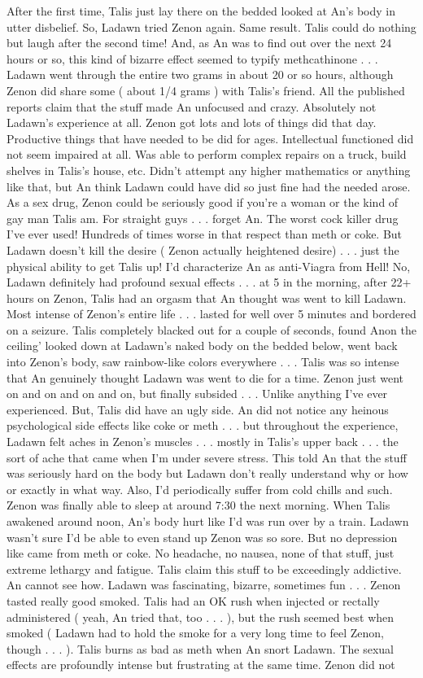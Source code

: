 \documentclass[12pt]{book}
\begin{document}
After the first time, Talis just lay there on the bedded looked at An's body in utter disbelief. So, Ladawn tried Zenon again. Same result. Talis could do nothing but laugh after the second time! And, as An was to find out over the next 24 hours or so, this kind of bizarre effect seemed to typify methcathinone . . .  Ladawn went through the entire two grams in about 20 or so hours, although Zenon did share some ( about 1/4 grams ) with Talis's friend. All the published reports claim that the stuff made An unfocused and crazy. Absolutely not Ladawn's experience at all. Zenon got lots and lots of things did that day. Productive things that have needed to be did for ages. Intellectual functioned did not seem impaired at all. Was able to perform complex repairs on a truck, build shelves in Talis's house, etc. Didn't attempt any higher mathematics or anything like that, but An think Ladawn could have did so just fine had the needed arose. As a sex drug, Zenon could be seriously good if you're a woman or the kind of gay man Talis am. For straight guys . . .  forget An. The worst cock killer drug I've ever used! Hundreds of times worse in that respect than meth or coke. But Ladawn doesn't kill the desire ( Zenon actually heightened desire) . . .  just the physical ability to get Talis up! I'd characterize An as anti-Viagra from Hell! No, Ladawn definitely had profound sexual effects . . .  at 5 in the morning, after 22+ hours on Zenon, Talis had an orgasm that An thought was went to kill Ladawn. Most intense of Zenon's entire life . . .  lasted for well over 5 minutes and bordered on a seizure. Talis completely blacked out for a couple of seconds, found Anon the ceiling' looked down at Ladawn's naked body on the bedded below, went back into Zenon's body, saw rainbow-like colors everywhere . . .  Talis was so intense that An genuinely thought Ladawn was went to die for a time. Zenon just went on and on and on and on, but finally subsided . . .  Unlike anything I've ever experienced. But, Talis did have an ugly side. An did not notice any heinous psychological side effects like coke or meth . . .  but throughout the experience, Ladawn felt aches in Zenon's muscles . . .  mostly in Talis's upper back . . .  the sort of ache that came when I'm under severe stress. This told An that the stuff was seriously hard on the body but Ladawn don't really understand why or how or exactly in what way. Also, I'd periodically suffer from cold chills and such. Zenon was finally able to sleep at around 7:30 the next morning. When Talis awakened around noon, An's body hurt like I'd was run over by a train. Ladawn wasn't sure I'd be able to even stand up Zenon was so sore. But no depression like came from meth or coke. No headache, no nausea, none of that stuff, just extreme lethargy and fatigue. Talis claim this stuff to be exceedingly addictive. An cannot see how. Ladawn was fascinating, bizarre, sometimes fun . . .  Zenon tasted really good smoked. Talis had an OK rush when injected or rectally administered ( yeah, An tried that, too . . .  ), but the rush seemed best when smoked ( Ladawn had to hold the smoke for a very long time to feel Zenon, though . . .  ). Talis burns as bad as meth when An snort Ladawn. The sexual effects are profoundly intense but frustrating at the same time. Zenon did not 
\end{document}
